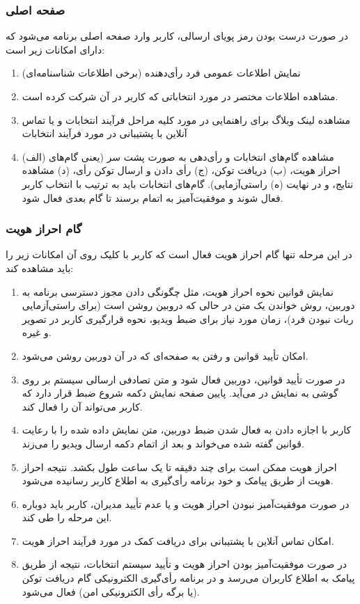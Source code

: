 \documentclass[12pt]{article}
\begin{document}
\subsubsection{صفحه اصلی}
در صورت درست بودن رمز پویای ارسالی، کاربر وارد صفحه اصلی برنامه می‌شود که دارای امکانات زیر است: 
\begin{enumerate}[label=(\arabic*)]
\item
نمایش اطلاعات عمومی فرد رأی‌دهنده  (برخی اطلاعات شناسنامه‌ای)
\item
مشاهده اطلاعات مختصر در مورد انتخاباتی که کاربر در آن شرکت کرده‌ است.
\item
مشاهده لینک وبلاگ برای راهنمایی در مورد کلیه مراحل فرآیند انتخابات و یا تماس آنلاین با پشتیبانی در مورد فرآیند انتخابات
\item
مشاهده گام‌های انتخابات و رأی‌دهی به صورت پشت سر  (یعنی گام‌های (الف) احراز هویت، (ب) دریافت توکن، (ج) رأی دادن و ارسال توکن رأی، (د) مشاهده نتایج، و در نهایت (ه) راستی‌آزمایی). گام‌های انتخابات باید به ترتیب با انتخاب کاربر فعال شوند و موفقیت‌آمیز به اتمام برسند تا گام بعدی فعال شود. 
\end{enumerate}


\subsubsection{گام احراز هویت}
در این مرحله تنها گام احراز هویت فعال است که کاربر با کلیک روی آن امکانات زیر را باید مشاهده کند: 
\begin{enumerate}[label=(\arabic*)]
\item
نمایش قوانین نحوه احراز هویت، مثل چگونگی دادن مجوز دسترسی برنامه به دوربین، روش خواندن یک متن  در حالی که دروبین روشن است (برای راستی‌آزمایی ربات نبودن فرد)، زمان مورد نیاز برای ضبط ویدیو، نحوه قرارگیری کاربر در تصویر و  غیره.
\item
امکان تأیید قوانین و رفتن به صفحه‌ای که در آن دوربین روشن می‌شود.
\item
در صورت تأیید قوانین، دوربین فعال شود و متن تصادفی ارسالی سیستم بر روی گوشی به نمایش در می‌آید. پایین صفحه نمایش دکمه شروع ضبط قرار دارد که کاربر می‌تواند آن را فعال کند.  
\item
کاربر با اجازه دادن به فعال شدن ضبط دوربین، متن نمایش داده شده را با رعایت قوانین گفته شده می‌خواند و بعد از اتمام دکمه ارسال ویدیو را می‌زند. 
\item
احراز هویت ممکن است برای چند دقیقه تا یک ساعت طول بکشد. نتیجه احراز هویت از طریق پیامک و خود برنامه رأی‌گیری به اطلاع کاربر رسانیده می‌شود.
\item
در صورت موفقیت‌آمیز نبودن احراز هویت و یا عدم تأیید مدیران، کاربر باید دوباره این مرحله را طی کند. 
\item
امکان تماس آنلاین با پشتیبانی برای دریافت کمک در مورد فرآیند احراز هویت.  
\item
در صورت موفقیت‌آمیز بودن احراز هویت و تأیید سیستم انتخابات، نتیجه از طریق پیامک به اطلاع کاربران می‌رسد و در برنامه رأی‌گیری الکترونیکی گام دریافت توکن (یا برگه رأی الکترونیکی امن) فعال می‌شود.
\end{enumerate}
\end{document}
